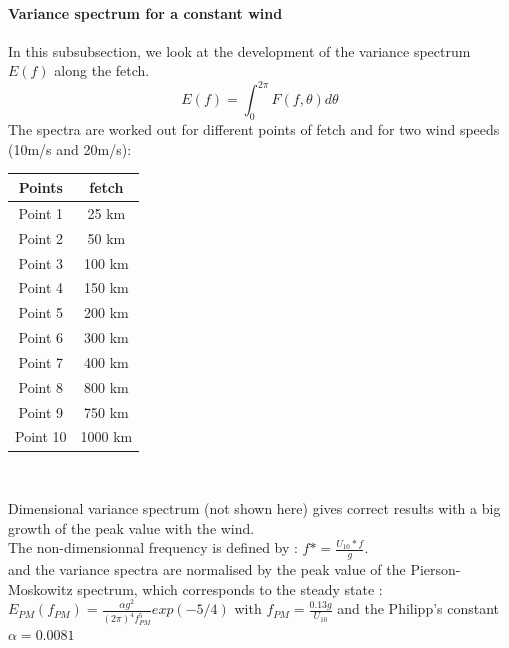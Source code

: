 \paragraph{Variance spectrum for a constant wind}
In this subsubsection, we look at the development of the variance spectrum $E(f)$ along the fetch.
\[ E(f) = \int_{0}^{2\pi} F(f,\theta )d\theta
\]
The spectra are worked out for different points of fetch and for two wind speeds (10m/s and 20m/s):\\
\begin{center}
\begin{tabular}{c|c}
Points & fetch\\
\hline
Point 1 & 25 km \\
Point 2 & 50 km \\
Point 3 & 100 km \\
Point 4 & 150 km \\
Point 5 & 200 km\\
Point 6 & 300 km \\
Point 7 & 400 km \\
Point 8 & 800 km\\
Point 9 & 750 km\\
Point 10 & 1000 km\\
\end{tabular}\\
\end{center}
Dimensional variance spectrum (not shown here) gives correct results with a big growth of the peak value with the wind.\\
The non-dimensionnal frequency is defined by : $f* = \frac{U_{10}*f}{g}$.\\
and the variance spectra are normalised by the peak value of the Pierson-Moskowitz spectrum, which corresponds to the steady state :\\
$E_{PM}(f_{PM}) = \frac{\alpha g^2}{(2\pi)^4 f_{PM}^5} exp(-5/4)$ with $f_{PM}=\frac{0.13 g}{U_{10}}$ and the Philipp's constant $\alpha = 0.0081$\\
